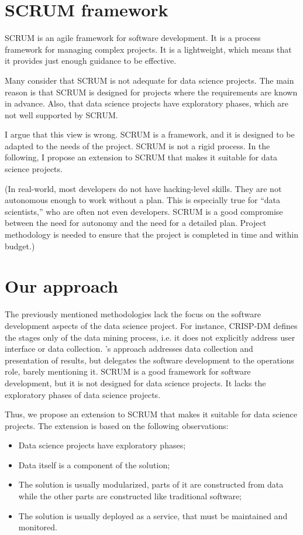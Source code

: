 \section{SCRUM framework}

SCRUM is an agile framework for software development.  It is a process framework for
managing complex projects.  It is a lightweight, which means that it
provides just enough guidance to be effective.

Many consider that SCRUM is not adequate for data science projects.  The main reason is
that SCRUM is designed for projects where the requirements are known in advance.  Also,
that data science projects have exploratory phases, which are not well supported by SCRUM.

I argue that this view is wrong.  SCRUM is a framework, and it is designed to be adapted to
the needs of the project.  SCRUM is not a rigid process.  In the following, I propose an
extension to SCRUM that makes it suitable for data science projects.

(In real-world, most developers do not have hacking-level skills.  They are not autonomous
enough to work without a plan.  This is especially true for ``data scientists,'' who are
often not even developers.  SCRUM is a good compromise between the need for autonomy and
the need for a detailed plan.  Project methodology is needed to ensure that the project is
completed in time and within budget.)

\section{Our approach}

The previously mentioned methodologies lack the focus on the software development aspects of
the data science project.  For instance, CRISP-DM defines the stages only of the data
mining process, i.e. it does not explicitly address user interface or data collection.
\citeauthor{Zumel2019}'s approach addresses data collection and presentation of results, but
delegates the software development to the operations role, barely mentioning it.  SCRUM is
a good framework for software development, but it is not designed for data science
projects.  It lacks the exploratory phases of data science projects.

Thus, we propose an extension to SCRUM that makes it suitable for data science projects.
The extension is based on the following observations:
\begin{itemize}
  \itemsep0em
  \item Data science projects have exploratory phases;
  \item Data itself is a component of the solution;
  \item The solution is usually modularized, parts of it are constructed from data while the
    other parts are constructed like traditional software;
  \item The solution is usually deployed as a service, that must be maintained and
    monitored.
\end{itemize}

